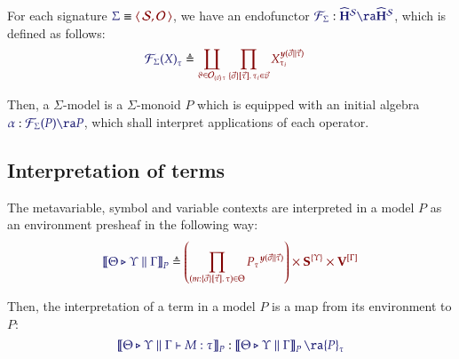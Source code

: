 \documentclass[11pt]{article}
\theoremstyle{definition}
\theoremstyle{remark}
\numberwithin{equation}{section}
\newcommand\HypCat{\mathbf{H}}
\begin{document}
For each signature $\Match{\Sigma}{\Pair{\Sorts}{\Operators}}$, we have an
endofunctor
$\Of{\SigFun{\Sigma}}{\widehat{\HypCat}^\Sorts\ra\widehat{\HypCat}^\Sorts}$,
which is defined as follows:
\begin{align*}
  \IMode{{\SigFun{\Sigma}(X)}_{\tau}}
&
    \triangleq
    \OMode{
      \coprod_{
        \vartheta\in \Operators_{\MkArity{\vec{v}}{\tau}}
      }
      \prod_{
        \MkValence
          {\vec{\sigma}}
          {\vec{\tau}}
          {\tau_i}
        \in\vec{v}
      }
      X_{\tau_i}^{\Yoneda{\vec{\sigma}\parallel\vec{\tau}}}
    }
\end{align*}

Then, a $\Sigma$-model is a $\Sigma$-monoid $P$ which is equipped with an
initial algebra $\Of{\alpha}{\SigFun{\Sigma}(P)\ra P}$, which shall interpret
applications of each operator.

\subsection{Interpretation of terms}

The metavariable, symbol and variable contexts are interpreted in a model $P$ as
an environment presheaf in the following way:
\[
  \Define{
    \SemBrackets{
      \Theta\triangleright\Upsilon\parallel\Gamma
    }_P
  }{
    \left(
      \prod_{
        (m:%
        \MkValence
          {\vec{\sigma}}
          {\vec{\tau}}
          {\tau})
        \in\Theta
      }{{P_{\tau}}^{\Yoneda{\vec{\sigma}\parallel\vec{\tau}}}}
    \right)
    \times
    \SymPsh^{\{\Upsilon\}}
    \times
    \VarPsh^{[\Gamma]}
  }
\]

Then, the interpretation of a term in a model $P$ is a map from its environment
to $P$:
\[
  \Of{
    \SemBrackets{
      \Theta\triangleright\Upsilon\parallel\Gamma\vdash M:\tau
    }_{P}
  }{
    \SemBrackets{
      \Theta\triangleright\Upsilon\parallel\Gamma
    }_{P}\ra {P}_{\tau}
  }
\]
\end{document}

